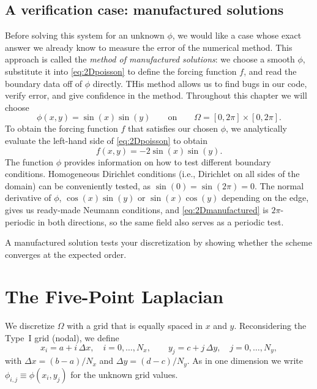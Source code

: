 \subsection*{A verification case: manufactured solutions}
Before solving this system for an unknown $\phi$, we would like a case whose exact answer
we already know to measure the error of the numerical method. This approach is called the \emph{method of manufactured solutions}: we choose a smooth
$\phi$, substitute it into \eqref{eq:2Dpoisson} to define the forcing function
$f$, and read the boundary data off of $\phi$ directly. THis method allows us to find bugs in our code, verify error, and give confidence in the method. Throughout this chapter we will choose
\begin{equation}
    \phi(x,y) = \sin(x)\sin(y)
    \qquad\text{on}\qquad
    \Omega = [0,2\pi]\times[0,2\pi].
    \label{eq:2Dmanufactured}
\end{equation}
To obtain the forcing function $f$ that satisfies our chosen $\phi$, we analytically evaluate the left-hand side of \eqref{eq:2Dpoisson} to obtain
\begin{equation}
    f(x,y) = -2\sin(x)\sin(y).
    \label{eq:2Dforcing}
\end{equation}
The function $\phi$ provides information on how to test different boundary conditions. Homogeneous Dirichlet conditions (i.e., Dirichlet on all sides of the domain) can be conveniently tested, as $\sin(0)=\sin(2\pi)=0$. The normal
derivative of $\phi$, $\cos(x)\sin(y)$ or $\sin(x)\cos(y)$ depending on the edge, gives
us ready-made Neumann conditions, and \eqref{eq:2Dmanufactured} is $2\pi$-periodic
in both directions, so the same field also serves as a periodic test. 

\begin{remark}
A manufactured solution tests your discretization by showing whether the scheme converges at the expected order.
\end{remark}

\section{The Five-Point Laplacian}
\label{sec:fivepoint}

We discretize $\Omega$ with a grid that is equally spaced in $x$ and $y$.
Reconsidering the Type~I grid (nodal), we define
\begin{equation}
    x_i = a + i\,\Delta x,\quad i=0,\dots,N_x,
    \qquad
    y_j = c + j\,\Delta y,\quad j=0,\dots,N_y,
    \label{eq:2Dgrid}
\end{equation}
with $\Delta x = (b-a)/N_x$ and $\Delta y = (d-c)/N_y$. As in one dimension we
write $\phi_{i,j}\equiv\phi(x_i,y_j)$ for the unknown grid values.

